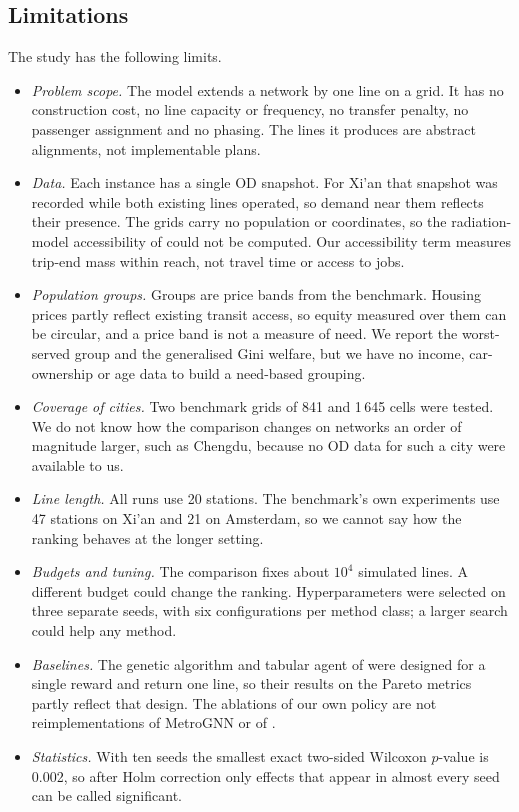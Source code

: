 \subsection{Limitations}\label{sec:limitations}
The study has the following limits.
\begin{itemize}
\item \emph{Problem scope.} The model extends a network by one line on a grid. It has no construction cost, no line capacity or frequency, no transfer penalty, no passenger assignment and no phasing. The lines it produces are abstract alignments, not implementable plans.
\item \emph{Data.} Each instance has a single OD snapshot. For Xi'an that snapshot was recorded while both existing lines operated, so demand near them reflects their presence. The grids carry no population or coordinates, so the radiation-model accessibility of \citet{simini2012} could not be computed. Our accessibility term measures trip-end mass within reach, not travel time or access to jobs.
\item \emph{Population groups.} Groups are price bands from the benchmark. Housing prices partly reflect existing transit access, so equity measured over them can be circular, and a price band is not a measure of need. We report the worst-served group and the generalised Gini welfare, but we have no income, car-ownership or age data to build a need-based grouping.
\item \emph{Coverage of cities.} Two benchmark grids of 841 and 1\,645 cells were tested. We do not know how the comparison changes on networks an order of magnitude larger, such as Chengdu, because no OD data for such a city were available to us.
\item \emph{Line length.} All runs use 20 stations. The benchmark's own experiments use 47 stations on Xi'an and 21 on Amsterdam, so we cannot say how the ranking behaves at the longer setting.
\item \emph{Budgets and tuning.} The comparison fixes about $10^4$ simulated lines. A different budget could change the ranking. Hyperparameters were selected on three separate seeds, with six configurations per method class; a larger search could help any method.
\item \emph{Baselines.} The genetic algorithm and tabular agent of \citet{michailidis2026} were designed for a single reward and return one line, so their results on the Pareto metrics partly reflect that design. The ablations of our own policy are not reimplementations of MetroGNN or of \citet{zhang2024}.
\item \emph{Statistics.} With ten seeds the smallest exact two-sided Wilcoxon $p$-value is 0.002, so after Holm correction only effects that appear in almost every seed can be called significant.
\end{itemize}
